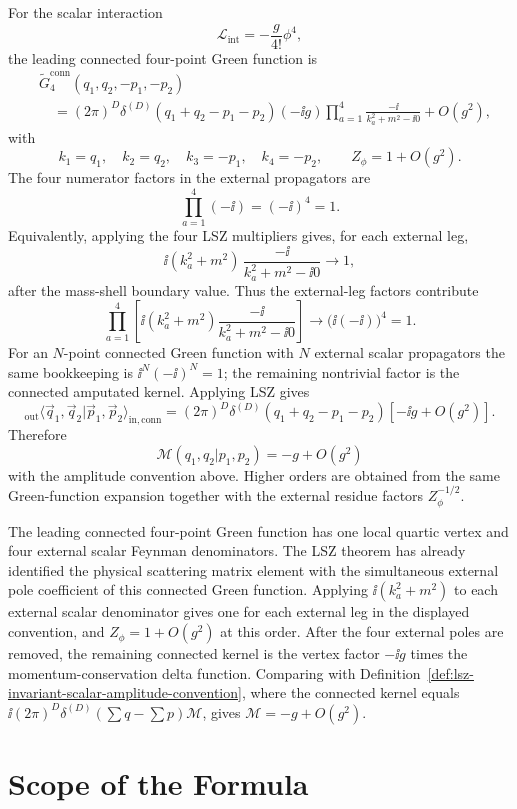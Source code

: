 For the scalar interaction
\[
  \mathcal L_{\mathrm{int}}=-\frac{g}{4!}\phi^4,
\]
the leading connected four-point Green function is
\[
\begin{aligned}
&\widetilde G^{\mathrm{conn}}_4
  (q_1,q_2,-p_1,-p_2)
\\
&\quad =
  (2\pi)^D\delta^{(D)}(q_1+q_2-p_1-p_2)
  (-\ii g)
  \prod_{a=1}^4
  \frac{-\ii}{k_a^2+m^2-\ii0}
  +O(g^2),
\end{aligned}
\]
with
\[
  k_1=q_1,\quad k_2=q_2,\quad k_3=-p_1,\quad k_4=-p_2,
  \qquad
  Z_\phi=1+O(g^2).
\]
The four numerator factors in the external propagators are
\[
  \prod_{a=1}^4(-\ii)=(-\ii)^4=1 .
\]
Equivalently, applying the four LSZ multipliers gives, for each external leg,
\[
  \ii(k_a^2+m^2)\,
  \frac{-\ii}{k_a^2+m^2-\ii0}
  \longrightarrow 1,
\]
after the mass-shell boundary value.  Thus the external-leg factors contribute
\[
  \prod_{a=1}^4\left[
    \ii(k_a^2+m^2)
    \frac{-\ii}{k_a^2+m^2-\ii0}
  \right]
  \longrightarrow
  \bigl(\ii(-\ii)\bigr)^4=1.
\]
For an \(N\)-point connected Green function with \(N\) external scalar
propagators the same bookkeeping is \(\ii^N(-\ii)^N=1\); the remaining
nontrivial factor is the connected amputated kernel.
Applying LSZ gives
\[
  {}_{\mathrm{out}}\langle
  \vec q_1,\vec q_2
  |\vec p_1,\vec p_2
  \rangle_{\mathrm{in,conn}}
  =
  (2\pi)^D\delta^{(D)}(q_1+q_2-p_1-p_2)
  \left[-\ii g+O(g^2)\right].
\]
Therefore
\[
  \mathcal M(q_1,q_2|p_1,p_2)
  =
  -g+O(g^2)
\]
with the amplitude convention above. Higher orders are obtained from the
same Green-function expansion together with the external residue factors
\(Z_\phi^{-1/2}\).

The leading connected four-point Green function has one local quartic vertex
and four external scalar Feynman denominators.  The LSZ theorem has already
identified the physical scattering matrix element with the simultaneous
external pole coefficient of this connected Green function.  Applying
\(\ii(k_a^2+m^2)\) to each external scalar denominator gives one for each
external leg in the displayed convention, and \(Z_\phi=1+O(g^2)\) at this
order.  After the four external poles are removed, the remaining connected
kernel is the vertex factor \(-\ii g\) times the momentum-conservation delta
function.  Comparing with
Definition~\ref{def:lsz-invariant-scalar-amplitude-convention}, where the
connected kernel equals \(\ii(2\pi)^D\delta^{(D)}(\sum q-\sum p)\mathcal M\),
gives \(\mathcal M=-g+O(g^2)\).

\section{Scope of the Formula}


